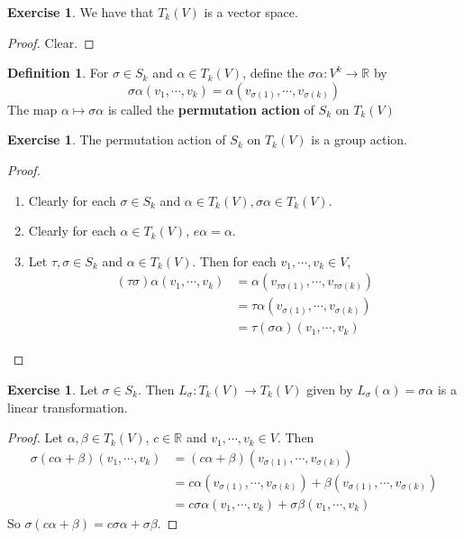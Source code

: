 \documentclass[12pt]{amsart}
\theoremstyle{definition}
\newtheorem{defn}[definition]{Definition}
\theoremstyle{remark}
\theoremstyle{definition}
\newtheorem{ex}[definition]{Exercise}
\newcommand{\al}{\alpha}
\newcommand{\sig}{\sigma}
\newcommand{\R}{\mathbb{R}}
\begin{document}
	\begin{ex}
		We have that $T_k(V)$ is a vector space. 
	\end{ex}

	\begin{proof}
		Clear.
	\end{proof}

	\begin{defn}
		For $\sig \in S_k$ and $\al \in T_k(V)$, define the $\sig \al : V^k \rightarrow \R$ by $$\sig \al(v_1, \cdots, v_k) = \al(v_{\sig(1)}, \cdots, v_{\sig(k)})$$  The map $\al \mapsto \sig \al$ is called the \textbf{permutation action} of $S_k$ on $T_k(V)$
	\end{defn}

	\begin{ex}
		The permutation action of $S_k$ on $T_k(V)$ is a group action.
	\end{ex}

	\begin{proof} \
		\begin{enumerate}
			\item Clearly for each $\sig \in S_k$ and $\al \in T_k(V), \sig \al \in T_k(V) $.
			\item Clearly for each $\al \in T_k(V)$, $e \al = \al$.
			\item Let $\tau, \sig \in S_k$ and $\al \in T_k(V)$. Then for each $v_1, \cdots, v_k \in V$, 
			\begin{align*}
				(\tau \sig) \al(v_1, \cdots, v_k) 
				&= \al(v_{\tau \sig (1)}, \cdots, v_{\tau \sig (k)}) \\
				&= \tau \al(v_{ \sig (1)}, \cdots, v_{ \sig (k)}) \\ 
				&= \tau (\sig \al) (v_1, \cdots, v_k) 
			\end{align*}
		\end{enumerate}
	\end{proof}

	\begin{ex}
		Let $\sig \in S_k$. Then $L_{\sig}: T_k(V) \rightarrow T_k(V)$ given by $ L_{\sig}(\al) = \sig \al$ is a linear transformation.
	\end{ex}

	\begin{proof}
		Let $\al, \beta \in T_k(V)$, $c \in \R$ and $v_1, \cdots, v_k \in V$. Then 
		\begin{align*}
			\sig(c\al + \beta)(v_1, \cdots, v_k) 
			&= (c\al + \beta)(v_{\sig(1)}, \cdots, v_{\sig(k)}) \\
			&= c \al(v_{\sig(1)}, \cdots, v_{\sig(k)}) + \beta(v_{\sig(1)}, \cdots, v_{\sig(k)}) \\
			&= c \sig \al(v_1, \cdots, v_k) + \sig \beta(v_1, \cdots, v_k)
		\end{align*}
		So $\sig(c \al + \beta) = c\sig \al + \sig \beta$.
	\end{proof}
	
\end{document}
